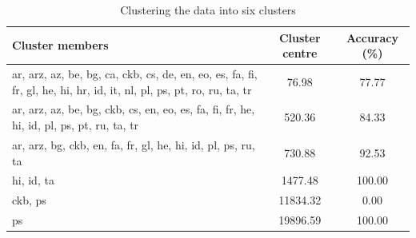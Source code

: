 \begin{table}[h]
\centering
\caption{Clustering the data into six clusters}
\label{tab:clusters}
\begin{tabular}{@{}lcc@{}}
\toprule
\textbf{Cluster members} & \textbf{Cluster centre} & \textbf{Accuracy (\%)} \\
\midrule
ar, arz, az, be, bg, ca, ckb, cs, de, en, eo, es, fa, fi, fr, gl, he, hi, hr, id, it, nl, pl, ps, pt, ro, ru, ta, tr & 76.98 & 77.77 \\
ar, arz, az, be, bg, ckb, cs, en, eo, es, fa, fi, fr, he, hi, id, pl, ps, pt, ru, ta, tr & 520.36 & 84.33 \\
ar, arz, bg, ckb, en, fa, fr, gl, he, hi, id, pl, ps, ru, ta & 730.88 & 92.53 \\
hi, id, ta & 1477.48 & 100.00 \\
ckb, ps & 11834.32 & 0.00 \\
ps & 19896.59 & 100.00 \\
\bottomrule
\end{tabular}
\end{table}
